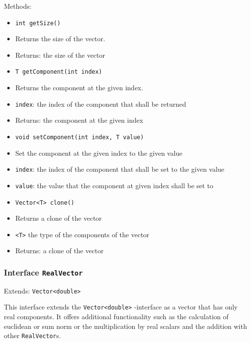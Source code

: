 \documentclass[parskip=full,11pt]{scrartcl}
\begin{document}
Methods:
\begin{itemize}\itemsep -10pt
\item \texttt{int getSize()}
\item[] Returns the size of the vector.
\item[] Returns: the size of the vector

\item \texttt{T getComponent(int index)}
\item[] Returns the component at the given index.
\item[] \texttt{index}: the index of the component that shall be returned
\item[] Returns: the component at the given index

\item \texttt{void setComponent(int index, T value)}
\item[] Set the component at the given index to the given value
\item[] \texttt{index}: the index of the component that shall be set to the given value
\item[] \texttt{value}: the value that the component at given index shall be set to

\item \texttt{Vector<T> clone()}
\item[] Returns a clone of the vector
\item[] \texttt{<T>} the type of the components of the vector
\item[] Returns: a clone of the vector
\end{itemize}

\subsubsection{Interface \texttt{RealVector}}
Extends: \texttt{Vector<double>}

This interface extends the \texttt{Vector<double>}
-interface as a vector that has only real components. It offers additional functionality such as the calculation of euclidean or sum norm or the multiplication by real scalars and the addition with other \texttt{RealVector}s.
\end{document}
